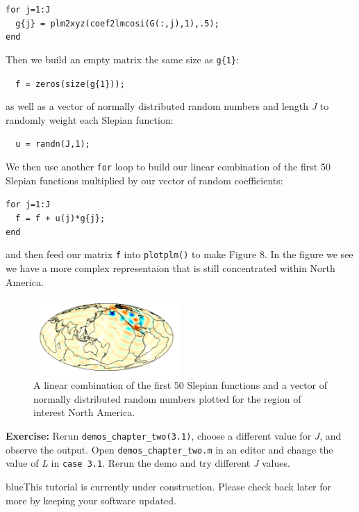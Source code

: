 \documentclass[11pt]{article}
\newcommand{\TAG}{\begin{color}{blue}This tutorial is currently under construction. Please check back later for more by keeping your software updated.\end{color}}
\begin{document}
\verb|for j=1:J| \\
\verb|	g{j} = plm2xyz(coef2lmcosi(G(:,j),1),.5);| \\
\verb|end|

Then we build an empty matrix the same size as \verb|g{1}|:

\verb|	f = zeros(size(g{1}));|

as well as a vector of normally distributed random numbers and length \textit{J} to randomly weight each Slepian function:

\verb|	u = randn(J,1);|

We then use another \verb|for| loop to build our linear combination of the first 50 Slepian functions multiplied by our vector of random coefficients:

\verb|for j=1:J| \\
\verb|	f = f + u(j)*g{j};| \\
\verb|end|

and then feed our matrix \verb|f| into \verb|plotplm()| to make Figure 8. In the figure we see we have a more complex representaion that is still concentrated within North America.

\begin{figure}[H]
  \centering
  \includegraphics[width=0.5\textwidth]{figures/figure8.png}
  \caption{A linear combination of the first 50 Slepian functions and a vector of normally distributed random numbers plotted for the region of interest North America.}
\label{figure8}
\end{figure}

\textbf{Exercise:} Rerun \verb|demos_chapter_two(3.1)|, choose a different value for \textit{J}, and observe the output. Open \verb|demos_chapter_two.m| in an editor and change the value of \textit{L} in \verb|case 3.1|. Rerun the demo and try different \textit{J} values. 

\TAG
\end{document}
